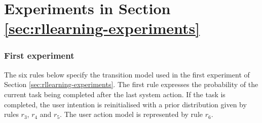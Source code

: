 \section{Experiments in Section \ref{sec:rllearning-experiments}}
\label{sec:domainspecs-rrlearning}

\subsubsection*{First experiment}

The six rules below specify the transition model used in the first experiment of Section \ref{sec:rllearning-experiments}. The first rule expresses the probability of the current task being completed after the last system action. If the task is completed, the user intention is reinitialised with a prior distribution given by rules $r_3$, $r_4$ and $r_5$. The user action model is represented by rule $r_6$.
 
